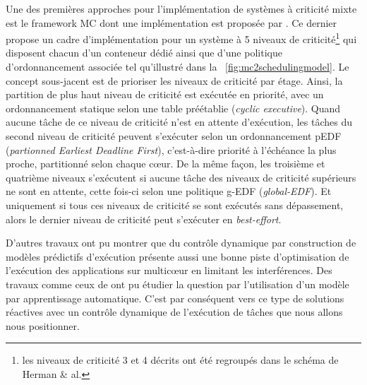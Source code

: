 \documentclass[french, a4paper, 11pt, twoside, pdftex]{StyleThese}
\begin{document}
     Une des premières approches pour l'implémentation de systèmes à criticité mixte est le framework MC \cite{anderson_multicore_2009} dont une implémentation est proposée par \cite{herman_rtos_2012}. Ce dernier propose un cadre d'implémentation pour un système à 5 niveaux de criticité\footnote{les niveaux de criticité 3 et 4 décrits ont été regroupés dans le schéma de Herman \& al.} qui disposent chacun d'un conteneur dédié ainsi que d'une politique d'ordonnancement associée tel qu'illustré dans la ~\autoref{fig:mc2schedulingmodel}. Le concept sous-jacent est de prioriser les niveaux de criticité par étage. Ainsi, la partition de plus haut niveau de criticité est exécutée en priorité, avec un ordonnancement statique selon une table préétablie (\textit{cyclic executive}). Quand aucune tâche de ce niveau de criticité n'est en attente d'exécution, les tâches du second niveau de criticité peuvent s'exécuter selon un ordonnancement pEDF (\textit{partionned Earliest Deadline First}), c'est-à-dire priorité à l'échéance la plus proche, partitionné selon chaque cœur. De la même façon, les troisième et quatrième niveaux s'exécutent si aucune tâche des niveaux de criticité supérieurs ne sont en attente, cette fois-ci selon une politique g-EDF (\textit{global-EDF}). Et uniquement si tous ces niveaux de criticité se sont exécutés sans dépassement, alors le dernier niveau de criticité peut s'exécuter en \textit{best-effort}. 

     
     D'autres travaux ont pu montrer que du contrôle dynamique par construction de modèles prédictifs d'exécution présente aussi une bonne piste d'optimisation de l'exécution des applications sur multicœur en limitant les interférences. Des travaux comme ceux de \cite{kim_application_2019} ont pu étudier la question par l'utilisation d'un modèle par apprentissage automatique. 
     C'est par conséquent vers ce type de solutions réactives avec un contrôle dynamique de l'exécution de tâches que nous allons nous positionner. 
\end{document}
